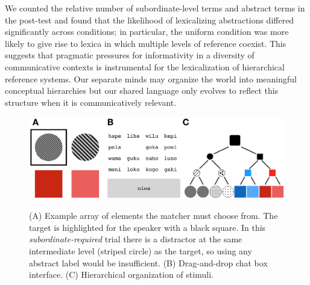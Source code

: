 \documentclass{evolang12}
\begin{document}
We counted the relative number of subordinate-level terms and abstract terms in the post-test and found that the likelihood of lexicalizing abstractions differed significantly across conditions; in particular, the uniform condition was more likely to give rise to lexica in which multiple levels of reference coexist. This suggests that pragmatic pressures for informativity in a diversity of communicative contexts is instrumental for the lexicalization of hierarchical reference systems. Our separate minds may organize the world into meaningful conceptual hierarchies but our shared language only evolves to reflect this structure when it is communicatively relevant. 

\begin{figure}[t]
\begin{center}
{\caption{{\footnotesize (A) Example array of elements the matcher must choose from. The target is highlighted for the speaker with a black square. In this \emph{subordinate-required} trial there is a distractor at the same intermediate level (striped circle) as the target, so using any abstract label would be insufficient. (B) Drag-and-drop chat box interface. (C) Hierarchical organization of stimuli.  \label{exp}}}}
{\includegraphics[scale=.41]{fig.png}}
\end{center}
\end{figure}

\newpage


 
\end{document}
